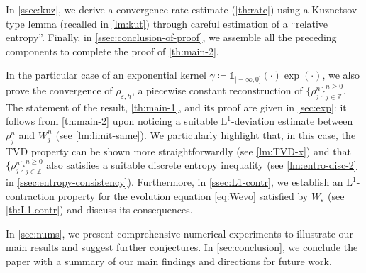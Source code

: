 \documentclass[10pt]{amsart}
\theoremstyle{plain}
\theoremstyle{definition}
\numberwithin{equation}{section}
\newcommand{\eps}{{\varepsilon}}
\begin{document}
In \cref{ssec:kuz}, we derive a convergence rate estimate (\cref{th:rate}) using a Kuznetsov-type lemma (recalled in \cref{lm:kut}) through careful estimation of a ``relative entropy''.
Finally, in \cref{ssec:conclusion-of-proof}, we assemble all the preceding components to complete the proof of \cref{th:main-2}.

In the particular case of an exponential kernel $\gamma \coloneqq \mathds{1}_{]-\infty,0]}(\cdot)\exp(\cdot)$, we also prove the convergence of $\rho_{\eps,h}$, a piecewise constant reconstruction of $\{\rho_j^n\}_{j \in \mathbb Z}^{n \ge 0}$. The statement of the result, \cref{th:main-1}, and its proof are given in \cref{sec:exp}: it follows from \cref{th:main-2} upon noticing a suitable $\mathrm{L}^1$-deviation estimate between $\rho_j^n$ and $W_j^n$ (see \cref{lm:limit-same}). We particularly highlight that, in this case, the TVD property can be shown more straightforwardly (see \cref{lm:TVD-x}) and that $\{\rho_j^n\}_{j \in \mathbb Z}^{n \ge 0}$ also satisfies a suitable discrete entropy inequality (see \cref{lm:entro-disc-2} in \cref{ssec:entropy-consistency}). Furthermore, in \cref{ssec:L1-contr}, we establish an $\mathrm{L}^1$-contraction property for the evolution equation \cref{eq:Wevo} satisfied by $W_\varepsilon$ (see \cref{th:L1.contr}) and discuss its consequences.

In \cref{sec:nums}, we present comprehensive numerical experiments to illustrate our main results and suggest further conjectures. In \cref{sec:conclusion}, we conclude the paper with a summary of our main findings and directions for future work.
\end{document}
